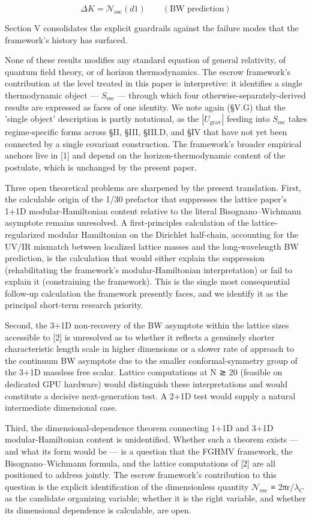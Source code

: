 \documentclass[11pt]{article}
\begin{document}
\[ ΔK = 𝒩_{\mathrm{esc}}(d1)\qquad(\text{BW prediction}) \]

Section V consolidates the explicit guardrails against the failure modes
that the framework's history has surfaced.

None of these results modifies any standard equation of general
relativity, of quantum field theory, or of horizon thermodynamics. The
escrow framework's contribution at the level treated in this paper is
interpretive: it identifies a single thermodynamic object --- $S_{\mathrm{esc}}$ ---
through which four otherwise-separately-derived results are expressed as
faces of one identity. We note again (§V.G) that the 'single object'
description is partly notational, as the $|U_{\mathrm{grav}}|$ feeding into $S_{\mathrm{esc}}$
takes regime-specific forms across §II, §III, §III.D, and §IV that have
not yet been connected by a single covariant construction. The
framework's broader empirical anchors live in [1] and depend on the
horizon-thermodynamic content of the postulate, which is unchanged by
the present paper.

Three open theoretical problems are sharpened by the present
translation. First, the calculable origin of the 1/30 prefactor that
suppresses the lattice paper's 1+1D modular-Hamiltonian content
relative to the literal Bisognano--Wichmann asymptote remains
unresolved. A first-principles calculation of the lattice-regularized
modular Hamiltonian on the Dirichlet half-chain, accounting for the
UV/IR mismatch between localized lattice masses and the long-wavelength
BW prediction, is the calculation that would either explain the
suppression (rehabilitating the framework's modular-Hamiltonian
interpretation) or fail to explain it (constraining the framework). This
is the single most consequential follow-up calculation the framework
presently faces, and we identify it as the principal short-term research
priority.

Second, the 3+1D non-recovery of the BW asymptote within the lattice
sizes accessible to [2] is unresolved as to whether it reflects a
genuinely shorter characteristic length scale in higher dimensions or a
slower rate of approach to the continuum BW asymptote due to the smaller
conformal-symmetry group of the 3+1D massless free scalar. Lattice
computations at N ≳ 20 (feasible on dedicated GPU hardware) would
distinguish these interpretations and would constitute a decisive
next-generation test. A 2+1D test would supply a natural intermediate
dimensional case.

Third, the dimensional-dependence theorem connecting 1+1D and 3+1D
modular-Hamiltonian content is unidentified. Whether such a theorem
exists --- and what its form would be --- is a question that the FGHMV
framework, the Bisognano--Wichmann formula, and the lattice computations
of [2] are all positioned to address jointly. The escrow framework's
contribution to this question is the explicit identification of the
dimensionless quantity $\mathcal{N}_{\mathrm{esc}}$ ≡ 2πr/$\lambda_{C}$ as the candidate organizing
variable; whether it is the right variable, and whether its dimensional
dependence is calculable, are open.
\end{document}
